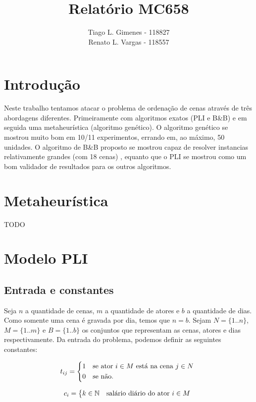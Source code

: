 \documentclass[a4paper,11pt]{article}
\title{Relatório MC658}
\author{Tiago L. Gimenes - 118827\\
        Renato L. Vargas - 118557}
\begin{document}
\maketitle

\section*{Introdução}
Neste trabalho tentamos atacar o problema de ordenação de cenas através de três
abordagens diferentes. Primeiramente com algoritmos exatos (PLI e B\&B) e em seguida
uma metaheurística (algoritmo genético). O algoritmo genético se mostrou muito bom
em 10/11 experimentos, errando em, ao máximo, 50 unidades. O algoritmo de B\&B
proposto se mostrou capaz de resolver instancias relativamente grandes (com 18 cenas)
, equanto que o PLI se mostrou como um bom validador de resultados para os outros
algoritmos.

\section{Metaheurística}
TODO

\section{Modelo PLI}
\subsection{Entrada e constantes}
Seja $n$ a quantidade de cenas, $m$ a quantidade de atores e $b$ a quantidade de
dias. Como somente uma cena é gravada por dia, temos que $n = b$. Sejam $N=\{1..n\}$,
$M = \{1..m\}$ e $B=\{1..b\}$ os conjuntos que representam as cenas, atores e dias
respectivamente. Da entrada do problema, podemos definir as seguintes constantes:

\begin{equation}
  t_{ij} = \begin{dcases*}
              1 & se ator $i \in M$ está na cena $j \in N$ \\
              0 & se não.
           \end{dcases*}
  \label{tij}
\end{equation}

\begin{equation}
  c_{i} = \begin{dcases*} k \in \mathbb{N} & salário diário do ator $i \in M$ \end{dcases*}
\end{equation}
\end{document}
